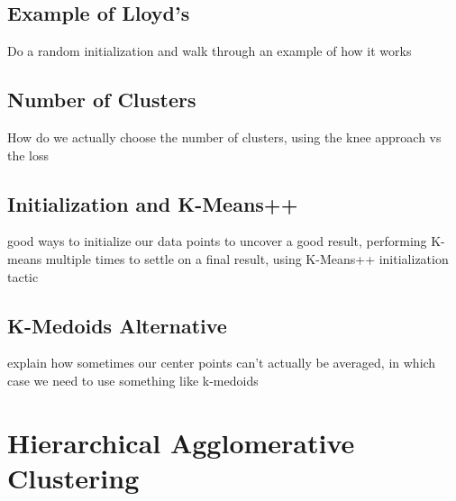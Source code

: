 \subsection{Example of Lloyd's}
Do a random initialization and walk through an example of how it works
\subsection{Number of Clusters}
How do we actually choose the number of clusters, using the knee approach vs the loss
\subsection{Initialization and K-Means++}
good ways to initialize our data points to uncover a good result, performing K-means multiple times to settle on a final result, using K-Means++ initialization tactic
\subsection{K-Medoids Alternative}
explain how sometimes our center points can't actually be averaged, in which case we need to use something like k-medoids

\section{Hierarchical Agglomerative Clustering}
